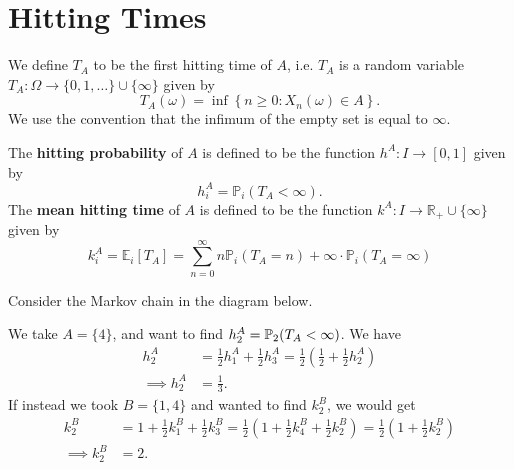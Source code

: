 \documentclass[a4paper,11pt]{article}
\begin{document}
\section{Hitting Times}

\begin{definition}
	We define $T_A$ to be the first hitting time of $A$, i.e. $T_A$ is a random variable $T_A: \Omega \rightarrow\{0,1, \ldots\} \cup\{\infty\}$ given by
    \[
    T_A(\omega)=\inf \left\{n \geq 0: X_n(\omega) \in A\right\} .
    \]
    We use the convention that the infimum of the empty set is equal to $\infty$.

    The \textbf{hitting probability} of $A$ is defined to be the function $h^A: I \rightarrow[0,1]$ given by
    \[
    h_i^A=\mathbb{P}_i\left(T_A<\infty\right) .
    \]
    The \textbf{mean hitting time} of $A$ is defined to be the function $k^A: I \rightarrow \mathbb{R}_{+} \cup\{\infty\}$ given by
    \[
    k_i^A=\mathbb{E}_i\left[T_A\right]=\sum_{n=0}^{\infty} n \mathbb{P}_i\left(T_A=n\right)+\infty \cdot \mathbb{P}_i\left(T_A=\infty\right)
    \]
\end{definition}

\begin{example}
	Consider the Markov chain in the diagram below.
	\begin{center}
		\end{center}

		We take $A = \{4\}$, and want to find $h_2^A = {\mathbb{P}}_2(T_A < \infty)$. We have
		\begin{align*}
			h_2^A &= \frac{1}{2}h_1^A +
			\frac{1}{2}h_3^A =\frac{1}{2}\left( \frac{1}{2}+\frac{1}{2}h_2^A \right) \\
		\implies h_2^A &= \frac{1}{3}.
		\end{align*}
		If instead we took $B = \{1, 4\}$ and wanted to find $k_2^B$, we would get
		\begin{align*}
			k_2^B &= 1+\frac{1}{2}k_1^B+\frac{1}{2}k_3^B=\frac{1}{2}\left( 1+\frac{1}{2}k_4^B+\frac{1}{2}k_2^B \right)=\frac{1}{2}\left( 1+\frac{1}{2}k_2^B \right)\\
	\implies k_2^B &= 2.
		\end{align*}
\end{example}
\end{document}
